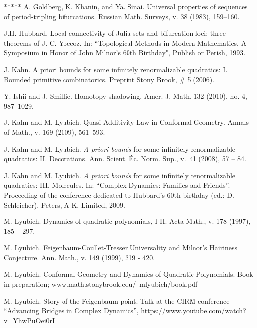\documentclass{amsart}
\newcommand{\1}{{\mathbb 1 }}
\begin{document}
\begin{thebibliography}{*****}
 A. Goldberg, K. Khanin, and Ya. Sinai. Universal properties of sequences of period-tripling bifurcations. Russian Math. Surveys, v. 38 (1983), 159--160.



 J.H. Hubbard.
   Local connectivity of Julia sets and bifurcation
     loci: three theorems of J.-C. Yoccoz. In:
    ``Topological Methods in Modern Mathematics, A Symposium in
     Honor of John Milnor's 60th Birthday", Publish or Perish, 1993.

    

 J. Kahn. A priori bounds for some infinitely renormalizable quadratics: I.
                  Bounded primitive combinatorics. Preprint Stony Brook, \# 5 (2006).   

 Y. Ishii and J. Smillie. Homotopy shadowing, Amer. J. Math. 132 (2010), no. 4,
987--1029.

 J. Kahn and M. Lyubich.
   Quasi-Additivity Law in Conformal Geometry. 
    Annals of Math., v. 169 (2009), 561--593. 


 J. Kahn and M. Lyubich. {\it A priori bounds} for some infinitely
renormalizable quadratics: II.  Decorations.
Ann. Scient. \'Ec. Norm. Sup., v.~41 (2008), 57 -- 84.

 J. Kahn and M. Lyubich. {\it A priori bounds} for some infinitely
renormalizable quadratics: III.  Molecules.  In: ``Complex Dynamics: Families and Friends''.
    Proceeding of the conference dedicated to Hubbard's 60th birthday (ed.:  D. Schleicher). 
    Peters, A K, Limited, 2009. 


 M. Lyubich. Dynamics of quadratic polynomials, I-II. 
   Acta Math., v. 178 (1997), 185 -- 297.



    M. Lyubich. 
Feigenbaum-Coullet-Tresser Universality and Milnor's Hairiness Conjecture. 
    Ann. Math., v. 149 (1999), 319 - 420.  
   
  M. Lyubich.
   Conformal Geometry and Dynamics of Quadratic Polynomials.
   Book in preparation;
   www.math.stonybrook.edu/~mlyubich/book.pdf
   
   
 M. Lyubich. Story of the Feigenbaum point. Talk at the CIRM conference \href{https://www.i2m.univ-amu.fr/events/advancing-bridges-in-complex-dynamics/}{``Advancing Bridges in Complex Dynamics''}, \href{https://www.youtube.com/watch?v=YhwPuOei0rI}{https://www.youtube.com/watch?v=YhwPuOei0rI}


\end{thebibliography}
\end{document}
